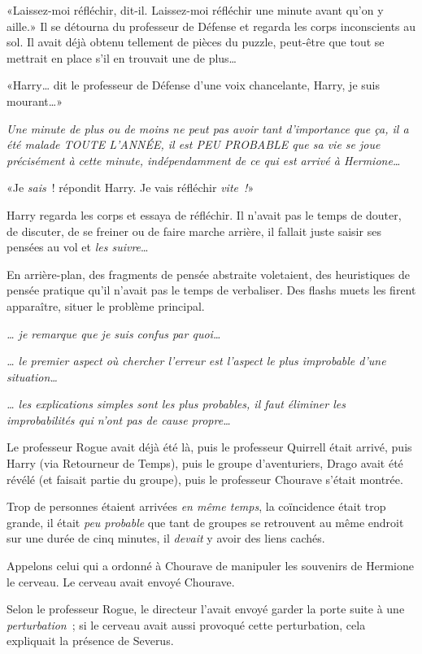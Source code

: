 «Laissez-moi réfléchir, dit-il. Laissez-moi réfléchir une minute avant qu'on y aille.» Il se détourna du professeur de Défense et regarda les corps inconscients au sol. Il avait déjà obtenu tellement de pièces du puzzle, peut-être que tout se mettrait en place s'il en trouvait une de plus…

«Harry… dit le professeur de Défense d'une voix chancelante, Harry, je suis mourant…»

\emph{Une minute de plus ou de moins ne peut pas avoir tant d'importance que ça, il a été malade TOUTE L'ANNÉE, il est PEU PROBABLE que sa vie se joue précisément à cette minute, indépendamment de ce qui est arrivé à Hermione…}

«Je \emph{sais}~! répondit Harry. Je vais réfléchir \emph{vite~!}»

Harry regarda les corps et essaya de réfléchir. Il n'avait pas le temps de douter, de discuter, de se freiner ou de faire marche arrière, il fallait juste saisir ses pensées au vol et \emph{les suivre}…

En arrière-plan, des fragments de pensée abstraite voletaient, des heuristiques de pensée pratique qu'il n'avait pas le temps de verbaliser. Des flashs muets les firent apparaître, situer le problème principal.

\emph{… je remarque que je suis confus par quoi…}

\emph{… le premier aspect où chercher l'erreur est l'aspect le plus improbable d'une situation…}

\emph{… les explications simples sont les plus probables, il faut éliminer les improbabilités qui n'ont pas de cause propre…}

Le professeur Rogue avait déjà été là, puis le professeur Quirrell était arrivé, puis Harry (via Retourneur de Temps), puis le groupe d'aventuriers, Drago avait été révélé (et faisait partie du groupe), puis le professeur Chourave s'était montrée.

Trop de personnes étaient arrivées \emph{en même temps}, la coïncidence était trop grande, il était \emph{peu probable} que tant de groupes se retrouvent au même endroit sur une durée de cinq minutes, il \emph{devait} y avoir des liens cachés.

Appelons celui qui a ordonné à Chourave de manipuler les souvenirs de Hermione le cerveau. Le cerveau avait envoyé Chourave.

Selon le professeur Rogue, le directeur l'avait envoyé garder la porte suite à une \emph{perturbation}~; si le cerveau avait aussi provoqué cette perturbation, cela expliquait la présence de Severus.

